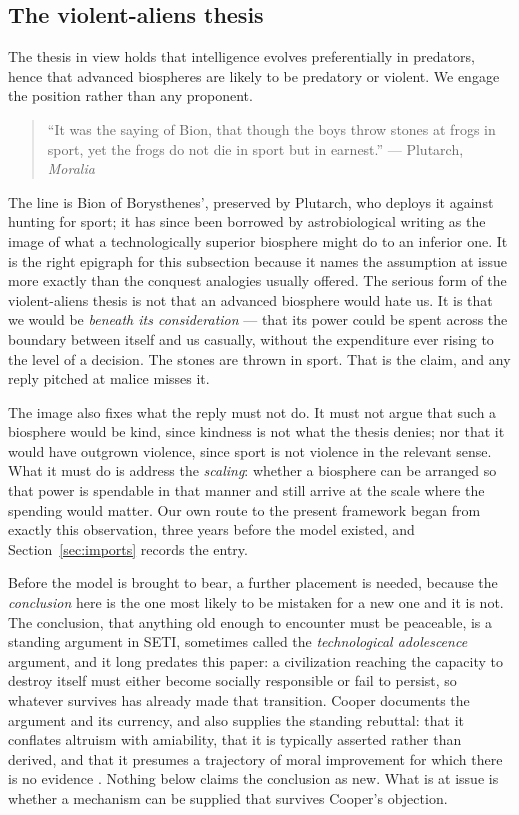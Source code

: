 \subsection{The violent-aliens thesis}\label{gr:subsub:violence}

The thesis in view holds that intelligence evolves preferentially in
predators, hence that advanced biospheres are likely to be predatory or
violent. We engage the position rather than any proponent.

\begin{quote}\small
``It was the saying of Bion, that though the boys throw stones at frogs
in sport, yet the frogs do not die in sport but in earnest.''
\hfill --- Plutarch, \emph{Moralia} \cite{Plutarch}
\end{quote}

\noindent The line is Bion of Borysthenes', preserved by Plutarch, who
deploys it against hunting for sport; it has since been borrowed by
astrobiological writing as the image of what a technologically superior
biosphere might do to an inferior one. It is the right epigraph for this
subsection because it names the assumption at issue more exactly than
the conquest analogies usually offered. The serious form of the
violent-aliens thesis is not that an advanced biosphere would hate us.
It is that we would be \emph{beneath its consideration} --- that its
power could be spent across the boundary between itself and us
casually, without the expenditure ever rising to the level of a
decision. The stones are thrown in sport. That is the claim, and any
reply pitched at malice misses it.

The image also fixes what the reply must not do. It must not argue that
such a biosphere would be kind, since kindness is not what the thesis
denies; nor that it would have outgrown violence, since sport is not
violence in the relevant sense. What it must do is address the
\emph{scaling}: whether a biosphere can be arranged so that power is
spendable in that manner and still arrive at the scale where the
spending would matter. Our own route to the present framework
began from exactly this observation, three years before the model
existed, and Section~\ref{sec:imports} records the entry.

Before the model is brought to bear, a further placement is needed, because the \emph{conclusion} here is the one most likely to be mistaken
for a new one and it is not. The conclusion, that anything old enough to encounter must be
peaceable, is a standing argument in SETI, sometimes called the
\emph{technological adolescence} argument, and it long predates this
paper: a civilization reaching the capacity to destroy itself must
either become socially responsible or fail to persist, so whatever
survives has already made that transition. Cooper documents the
argument and its currency, and also supplies the standing rebuttal: that
it conflates altruism with amiability, that it is typically asserted
rather than derived, and that it presumes a trajectory of moral
improvement for which there is no evidence \cite{Cooper19}. Nothing
below claims the conclusion as new. What is at issue is whether a
mechanism can be supplied that survives Cooper's objection.

